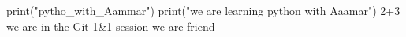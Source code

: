 print("pytho_with_Aammar")
print("we are learning python with Aaamar")
2+3
 we are in the Git 1&1 session
we are friend


